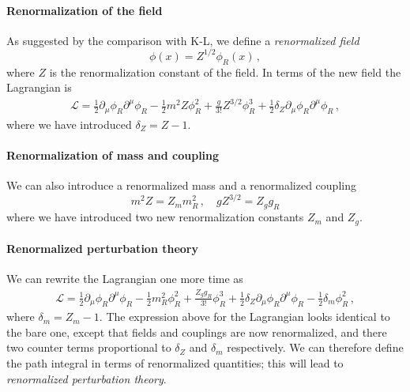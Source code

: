 \paragraph{Renormalization of the field}

As suggested by the comparison with K-L, we define a {\em
  renormalized field}
\begin{equation}
  \label{eq:RenormField}
  \phi(x) = Z^{1/2} \phi_R(x)\, ,
\end{equation}
where $Z$ is the renormalization constant of the field.  In terms of
the new field the Lagrangian is
\begin{align}
  \mathcal{L}= \frac12 \partial_\mu \phi_R \partial^\mu \phi_R -
  \frac12 m^2 Z \phi_R^2 + \frac{g}{3!} Z^{3/2} \phi_R^3 +
  \frac12 \delta_Z \partial_\mu \phi_R \partial^\mu \phi_R\, ,
\end{align}
where we have introduced $\delta_Z=Z-1$.

\paragraph{Renormalization of mass and coupling}

We can also introduce a renormalized mass and a renormalized coupling
\begin{equation}
  \label{eq:RenormMass}
  m^2 Z = Z_m m_R^2\, ,\quad g Z^{3/2}= Z_g g_R
\end{equation}
where we have introduced two new renormalization constants $Z_m$ and
$Z_g$.

\paragraph{Renormalized perturbation theory}

We can rewrite the Lagrangian one more time as
\begin{align}
  \mathcal{L}= \frac12 \partial_\mu \phi_R \partial^\mu \phi_R -
  \frac12 m_R^2 \phi_R^2 + \frac{Z_g g_R}{3!} \phi_R^3 +
  \frac12 \delta_Z \partial_\mu \phi_R \partial^\mu \phi_R
  - \frac12 \delta_m \phi_R^2
  \, ,
\end{align}
where $\delta_m=Z_m-1$. The expression above for the Lagrangian looks
identical to the bare one, except that fields and couplings are now
renormalized, and there two counter terms proportional to $\delta_Z$
and $\delta_m$ respectively. We can therefore define the path integral
in terms of renormalized quantities; this will lead to 
{\em renormalized perturbation theory}. 

